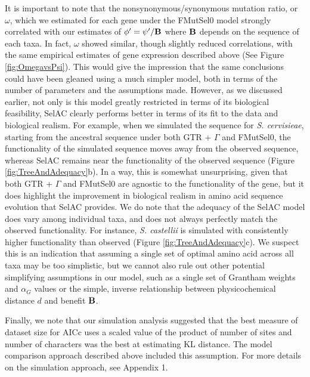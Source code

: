 \documentclass[12pt,letterpaper]{article}
\newcommand{\Func}{\ensuremath{\text{\textbf{B}}}\xspace}
\newcommand{\selac}{SelAC\xspace}
\newcommand{\alphag}{\ensuremath{\alpha_G}\xspace}
\newcommand{\phiprime}{\ensuremath{\phi^\prime}\xspace}
\newcommand{\psiprime}{\ensuremath{\psi^\prime}\xspace}
\begin{document}
It is important to note that the nonsynonymous/synonymous mutation ratio, or $\omega$, which we estimated for each gene under the FMutSel0 model strongly correlated with our estimates of $\phiprime = \psiprime/\Func$ where $\Func$ depends on the sequence of each taxa.
In fact, $\omega$ showed similar, though slightly reduced correlations, with the same empirical estimates of gene expression described above (See Figure \ref{fig:OmegavsPsi}).
This would give the impression that the same conclusions could have been gleaned using a much simpler model, both in terms of the number of parameters and the assumptions made.
However, as we discussed earlier, not only is this model greatly restricted in terms of its biological feasibility, \selac clearly performs better in terms of its fit to the data and biological realism.
For example, when we simulated the sequence for \emph{S. cervisieae}, starting from the ancestral sequence under both GTR + $\Gamma$ and FMutSel0, the functionality of the simulated sequence moves away from the observed sequence, whereas SelAC remains near the functionality of the observed sequence (Figure \ref{fig:TreeAndAdequacy}b).
In a way, this is somewhat unsurprising, given that both GTR + $\Gamma$ and FMutSel0 are agnostic to the functionality of the gene, but it does highlight the improvement in biological realism in amino acid sequence evolution that \selac provides.
We do note that the adequacy of the \selac model does vary among individual taxa, and does not always perfectly match the observed functionality.
For instance, \emph{S. castellii} is simulated with consistently higher functionality than observed (Figure \ref{fig:TreeAndAdequacy}c).
We suspect this is an indication that assuming a single set of optimal amino acid across all taxa may be too simplistic, but we cannot also rule out other potential simplifying assumptions in our model, such as a single set of Grantham weights and $\alphag$ values or the simple, inverse relationship between physicochemical distance $d$ and benefit \Func.

Finally, we note that our simulation analysis suggested that the best measure of dataset size for AICc uses a scaled value of the product of number of sites and number of characters was the best at estimating KL distance.
The model comparison approach described above included this assumption.
For more details on the simulation approach, see Appendix 1.
\end{document}
